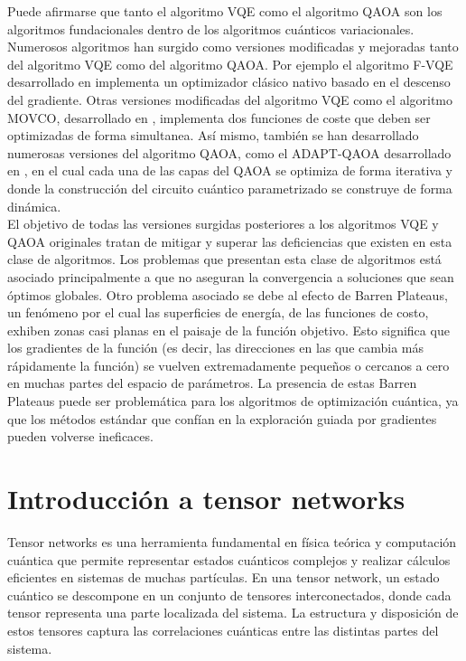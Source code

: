 \newpage 

Puede afirmarse que tanto el algoritmo VQE como el algoritmo QAOA son los algoritmos fundacionales dentro de los algoritmos cuánticos variacionales. Numerosos algoritmos han surgido como versiones modificadas y mejoradas tanto del algoritmo VQE como del algoritmo QAOA. Por ejemplo el algoritmo F-VQE desarrollado en \citep{amaro} implementa un optimizador clásico nativo basado en el descenso del gradiente. Otras versiones modificadas del algoritmo VQE como el algoritmo MOVCO, desarrollado en \citep{luis}, implementa dos funciones de coste que deben ser optimizadas de forma simultanea. Así mismo, también se han desarrollado numerosas versiones del algoritmo QAOA, como el ADAPT-QAOA desarrollado en \citep{zhu}, en el cual cada una de las capas del QAOA se optimiza de forma iterativa y donde la construcción del circuito cuántico parametrizado se construye de forma dinámica. \\

El objetivo de todas las versiones surgidas posteriores a los algoritmos VQE y QAOA originales tratan de mitigar y superar las deficiencias que existen en esta clase de algoritmos. Los problemas que presentan esta clase de algoritmos está asociado principalmente a que no aseguran la convergencia a soluciones que sean óptimos globales. Otro problema asociado se debe al efecto de Barren Plateaus, un fenómeno por el cual las superficies de energía, de las funciones de costo, exhiben zonas casi planas en el paisaje de la función objetivo. Esto significa que los gradientes de la función (es decir, las direcciones en las que cambia más rápidamente la función) se vuelven extremadamente pequeños o cercanos a cero en muchas partes del espacio de parámetros. La presencia de estas Barren Plateaus puede ser problemática para los algoritmos de optimización cuántica, ya que los métodos estándar que confían en la exploración guiada por gradientes pueden volverse ineficaces. 

\section{Introducción a tensor networks}


Tensor networks es una herramienta fundamental en física teórica y computación cuántica que permite representar estados cuánticos complejos y realizar cálculos eficientes en sistemas de muchas partículas. En una tensor network, un estado cuántico se descompone en un conjunto de tensores interconectados, donde cada tensor representa una parte localizada del sistema. La estructura y disposición de estos tensores captura las correlaciones cuánticas entre las distintas partes del sistema. \\

